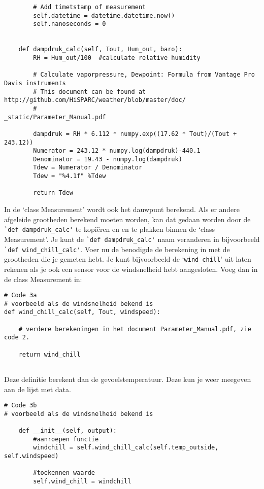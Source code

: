 \begin{verbatim}
        # Add timetstamp of measurement
        self.datetime = datetime.datetime.now()
        self.nanoseconds = 0


    def dampdruk_calc(self, Tout, Hum_out, baro):
        RH = Hum_out/100  #calculate relative humidity

        # Calculate vaporpressure, Dewpoint: Formula from Vantage Pro Davis instruments
        # This document can be found at http://github.com/HiSPARC/weather/blob/master/doc/
        #                                        _static/Parameter_Manual.pdf

        dampdruk = RH * 6.112 * numpy.exp((17.62 * Tout)/(Tout + 243.12))
        Numerator = 243.12 * numpy.log(dampdruk)-440.1
        Denominator = 19.43 - numpy.log(dampdruk)
        Tdew = Numerator / Denominator
        Tdew = "%4.1f" %Tdew

        return Tdew

\end{verbatim}

In de `class Measurement' wordt ook het dauwpunt berekend. Als er andere
afgeleide grootheden berekend moeten worden, kan dat gedaan worden door
de \verb|`def dampdruk_calc'| te kopiëren en en te plakken binnen de
`class Measurement'. Je kunt de \verb|`def dampdruk_calc'| naam veranderen in
bijvoorbeeld \verb|`def wind_chill_calc'|. Voer nu de benodigde de berekening in 
met de grootheden die je gemeten hebt. Je kunt bijvoorbeeld de
`\verb|wind_chill|' uit laten rekenen als je ook een sensor voor de
windsnelheid hebt aangesloten. Voeg dan in de class Measurement in:

\begin{verbatim}
# Code 3a
# voorbeeld als de windsnelheid bekend is
def wind_chill_calc(self, Tout, windspeed):
    
    # verdere berekeningen in het document Parameter_Manual.pdf, zie code 2.
    
    return wind_chill
    
\end{verbatim}        

Deze definitie berekent dan de gevoelstemperatuur. Deze kun je weer meegeven aan 
de lijst met data.

\begin{verbatim}
# Code 3b
# voorbeeld als de windsnelheid bekend is

    def __init__(self, output):
        #aanroepen functie
        windchill = self.wind_chill_calc(self.temp_outside, self.windspeed)

        #toekennen waarde
        self.wind_chill = windchill
        
\end{verbatim}   
        

